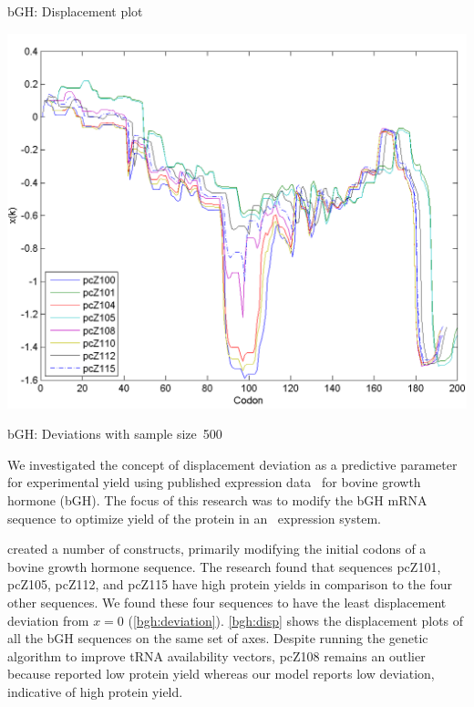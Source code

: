 \documentclass[twocolumn]{article}
\begin{document}
\begin{cfigure}
  \caption{bGH: Displacement plot}
  \label{bgh:disp}
  \includegraphics[width=\linewidth]{bgh/all}
\end{cfigure}

\begin{table}
  \centering
  \caption{bGH: Deviations with sample size~500}
  \label{bgh:deviation}
  
\end{table}

We investigated the concept of displacement deviation as a predictive parameter
for experimental yield using published expression data~\cite{schoner:bgh} for bovine growth hormone (bGH).
The focus of this research was to modify the bGH mRNA sequence to optimize
yield of the protein in an \ecoli\ expression system.

\citet{schoner:bgh} created a number of constructs, primarily modifying the initial codons of a
bovine growth hormone sequence.  The research found that sequences pcZ101,
pcZ105, pcZ112, and pcZ115 have high protein yields
in comparison to the four other sequences. We found these four sequences  to have the least
displacement deviation from $x = 0$
(\autoref{bgh:deviation}). \autoref{bgh:disp} shows the displacement
plots of all the bGH sequences on the same set of axes. 
Despite running the genetic algorithm to improve tRNA availability vectors, pcZ108 remains an
outlier because \citeauthor{schoner:bgh} reported low protein
yield whereas our model reports low deviation, indicative of 
high protein yield.
\end{document}
